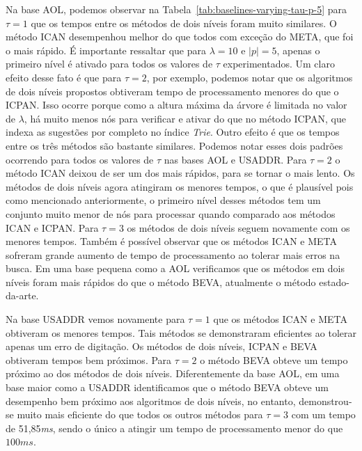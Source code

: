 Na base AOL, podemos observar na Tabela~\ref{tab:baselines-varying-tau-p-5} para $\tau=1$ que os tempos entre os métodos de dois níveis foram muito similares. O método ICAN desempenhou melhor do que todos com exceção do META, que foi o mais rápido. É importante ressaltar que para $\lambda=10$ e $|p|=5$, apenas o primeiro nível é ativado para todos os valores de $\tau$ experimentados. Um claro efeito desse fato é que para $\tau=2$, por exemplo, podemos notar que os algoritmos de dois níveis propostos obtiveram tempo de processamento menores do que o ICPAN. Isso ocorre porque como a altura máxima da árvore é limitada no valor de $\lambda$, há muito menos nós para verificar e ativar do que no método ICPAN, que indexa as sugestões por completo no índice \textit{Trie}. Outro efeito é que os tempos entre os três métodos são bastante similares. Podemos notar esses dois padrões ocorrendo para todos os valores de $\tau$ nas bases AOL e USADDR. Para $\tau=2$ o método ICAN deixou de ser um dos mais rápidos, para se tornar o mais lento. Os métodos de dois níveis agora atingiram os menores tempos, o que é plausível pois como mencionado anteriormente, o primeiro nível desses métodos tem um conjunto muito menor de nós para processar quando comparado aos métodos ICAN e ICPAN. Para $\tau=3$ os métodos de dois níveis seguem novamente com os menores tempos. Também é possível observar que os métodos ICAN e META sofreram grande aumento de tempo de processamento ao tolerar mais erros na busca. Em uma base pequena como a AOL verificamos que os métodos em dois níveis foram mais rápidos do que o método BEVA, atualmente o método estado-da-arte.

Na base USADDR vemos novamente para $\tau=1$ que os métodos ICAN e META obtiveram os menores tempos. Tais métodos se demonstraram eficientes ao tolerar apenas um erro de digitação. Os métodos de dois níveis, ICPAN e BEVA obtiveram tempos bem próximos. Para $\tau=2$ o método BEVA obteve um tempo próximo ao dos métodos de dois níveis. Diferentemente da base AOL, em uma base maior como a USADDR identificamos que o método BEVA obteve um desempenho bem próximo aos algoritmos de dois níveis, no entanto, demonstrou-se muito mais eficiente do que todos os outros métodos para $\tau=3$ com um tempo de 51,85\textit{ms}, sendo o único a atingir um tempo de processamento menor do que $100ms$. 

